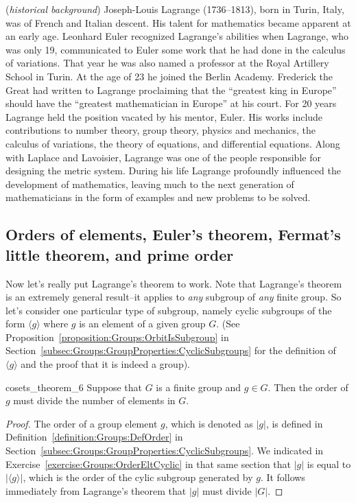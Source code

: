 \begin{rem} (\emph{historical background})  Joseph-Louis Lagrange (1736--1813), born in Turin, Italy, was of French and Italian descent.  His talent for mathematics became apparent at an early age.  Leonhard Euler recognized Lagrange's abilities when Lagrange, who was only 19, communicated to Euler some work that he had done in the calculus of variations.  That year he was also named a professor at the Royal Artillery School in Turin.  At the age of 23 he joined the Berlin Academy. Frederick the Great had written to Lagrange proclaiming that the ``greatest king in Europe'' should have the ``greatest mathematician in Europe'' at his court.  For 20 years Lagrange held the position vacated by his mentor, Euler.  His works include contributions to number theory, group theory, physics and mechanics, the calculus of variations, the theory of equations, and differential equations.  Along with Laplace and Lavoisier, Lagrange was one of the people responsible for designing the metric system.  During his life Lagrange profoundly influenced the development of mathematics, leaving much to the next generation of mathematicians in the form of examples and new problems to be solved. 
\end{rem}

\subsection{Orders of elements, Euler's theorem, Fermat's little theorem, and prime order}\label{sec:Cosets:Fermat}

Now let's really put Lagrange's theorem to work. Note that Lagrange's theorem is an extremely general result--it applies to \emph{any} subgroup of \emph{any} finite group. So let's consider one particular type of subgroup, namely cyclic subgroups of the form $\langle g \rangle$ where  $g$ is an element of a given group $G$. (See Proposition~\ref{proposition:Groups:OrbitIsSubgroup} in Section~\ref{subsec:Groups:GroupProperties:CyclicSubgroups}  for the definition of $\langle g \rangle$ and the proof that it is indeed a group).

\begin{prop}{cosets_theorem_6}
Suppose that $G$ is a finite group and $g \in G$.  Then the order of $g$ must divide the number of elements in $G$. 
\end{prop}

\begin{proof}
The order of a group element $g$, which is denoted as $|g|$, is defined in Definition~\ref{definition:Groups:DefOrder} in Section~\ref{subsec:Groups:GroupProperties:CyclicSubgroups}. We indicated in Exercise~\ref{exercise:Groups:OrderEltCyclic} in that same section that $|g|$ is equal to $|\langle g \rangle|$, which is  the order of the cylic subgroup generated by $g$. It follows immediately from Lagrange's theorem that $|g|$ must divide $|G|$.
\end{proof}

